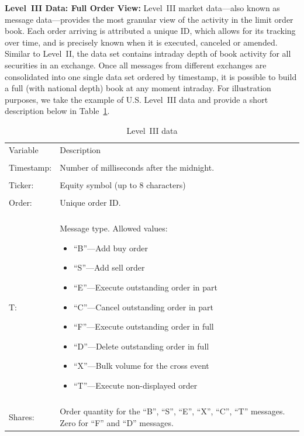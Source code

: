 \noindent\textbf{Level~III Data: Full Order View:} Level~III market data---also known as message data---provides the most granular view of the activity in the limit order book. Each order arriving is attributed a unique ID, which allows for its tracking over time, and is precisely known when it is executed, canceled or amended. Similar to Level~II, the data set contains intraday depth of book activity for all securities in an exchange. Once all messages from different exchanges are consolidated into one single data set ordered by timestamp, it is possible to build a full (with national depth) book at any moment intraday. For illustration purposes, we take the example of U.S. Level~III data and provide a short description below in Table~\ref{tab:level3data}. \label{in:level3dat1}
	\begin{table}[!ht]
	\centering
	\caption{Level~III data\label{tab:level3data}}
	\begin{tabular}{lp{}} 
	Variable & Description \\
	& \\
	Timestamp: & Number of milliseconds after the midnight. \\
	& \\
	Ticker: & Equity symbol (up to 8 characters) \\
	& \\
	Order: & Unique order ID. \\
	& \\
	T: & Message type. Allowed values: \newline \begin{minipage}[t]{0.6\textwidth} \begin{itemize} \item ``B''---Add buy order \item ``S''---Add sell order \item ``E''---Execute outstanding order in part \item ``C''---Cancel outstanding order in part \item ``F''---Execute outstanding order in full \item ``D''---Delete outstanding order in full \item ``X''---Bulk volume for the cross event \item ``T''---Execute non-displayed order \end{itemize} \end{minipage} \\
	& \\
	Shares: & Order quantity for the ``B'', ``S'', ``E'', ``X'', ``C'', ``T'' messages. Zero for ``F'' and ``D'' messages. \\

\end{tabular}
\end{table}
